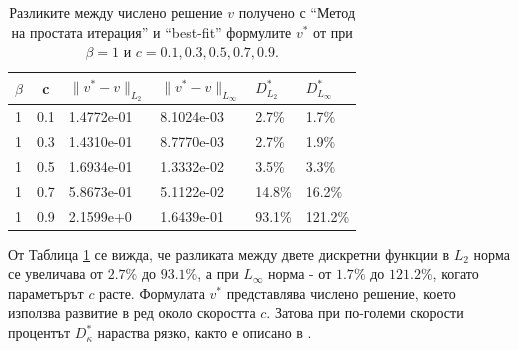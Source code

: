 \documentclass[a4paper]{article}
\theoremstyle{remark}
\begin{document}
\begin{table}[ht]
\centering
\begin{tabular}{|l|c|l l|l l|}
\hline 
\hline 
$\beta$	& c 	& $\|v^*-v \|_{L_2 }$ & $\|v^*-v \|_{L_\infty }$  	& $D^*_{L_2}$	& $D^*_{L_\infty }$	\\
\hline 
1& 		0.1	&	1.4772e-01 		& 	8.1024e-03 				& 2.7\%			& 1.7\%		\\
\hline 
1& 		0.3 	&	1.4310e-01 		& 	8.7770e-03				& 2.7\%			& 1.9\%		\\
\hline 
1& 		0.5 	&	1.6934e-01 		& 	1.3332e-02				& 3.5\%			& 3.3\%		\\
\hline 
1& 		0.7 	&	5.8673e-01		& 	5.1122e-02				& 14.8\%		& 16.2\%	\\
\hline 
1& 		0.9	&	2.1599e+0 		& 	1.6439e-01				& 93.1\%		& 121.2\%	\\
\hline 
\hline 
\end{tabular}
\caption{Разликите между числено решение $v$ получено с ``Метод на простата итерация'' и ``best-fit'' формулите $v^*$ от \cite{Ch2011} при $\beta=1$ и $c=0.1, 0.3, 0.5, 0.7, 0.9$.}
\label{tab:diff-beta1}
\end{table}
От Таблица \ref{tab:diff-beta1} се вижда, че разликата между двете дискретни функции в $L_2$ норма се увеличава от $2.7\%$ до $93.1\%$, а при $L_\infty$ норма - от $1.7\%$ до $121.2\%$, когато параметърът $c$ расте. Формулата $v^*$ представлява числено решение, което използва развитие в ред около скоростта $c$. Затова при по-големи скорости процентът $D^*_{\kappa}$ нараства рязко, както е описано в \cite{Ch2011}.

\end{document}
